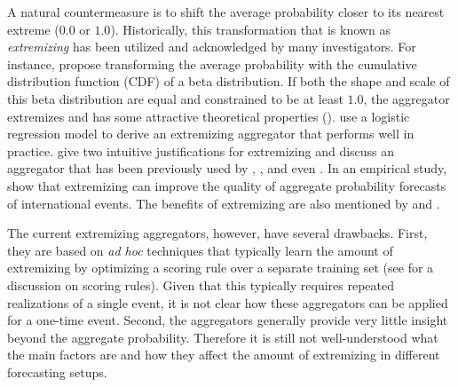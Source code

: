 \documentclass[11pt]{article}
\theoremstyle{definition}
\theoremstyle{definition}
\begin{document}
A natural countermeasure is to shift the average probability closer to its nearest extreme ($0.0$ or $1.0$). Historically, this transformation that is known as \textit{extremizing} has been utilized and acknowledged by many investigators. For instance, \cite{Ranjan08} propose transforming the average probability with the cumulative distribution function (CDF) of a beta distribution. If both the shape and scale of this beta distribution are equal and constrained to be at least $1.0$,  the aggregator extremizes and has some attractive theoretical properties (\cite{Wallsten2001}). \cite{satopaa} use a logistic regression model to derive an extremizing aggregator that performs well in practice.  \cite{baron2014two} give two intuitive justifications for extremizing and discuss an aggregator that has been previously used by \cite{Erev1994}, \cite{shlomi2010subjective}, and even \cite{karmarkar1978subjectively}. In an empirical study, \cite{mellers2014psychological} show that extremizing can improve the quality of aggregate probability forecasts of international events.  The benefits of extremizing are also mentioned by \cite{turner2013forecast} and \cite{Ariely00theeffects}.


The current extremizing aggregators, however, have several drawbacks. First, they are based on \textit{ad hoc} techniques that typically learn the amount of extremizing by optimizing a scoring rule  over a separate training set (see \cite{Gneiting04strictlyproper} for a discussion on scoring rules). Given that this typically requires repeated realizations of a single event, it is not clear how these aggregators can be applied for a one-time event.
Second, the aggregators generally provide very little insight beyond the aggregate probability. Therefore it is still not well-understood what the main factors are and how they affect the amount of extremizing in different forecasting setups.
\end{document}
